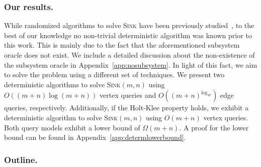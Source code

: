 \documentclass[runningheads,a4paper]{llncs}
\newcommand{\sink}{\textsc{Sink}\xspace}
\newcommand{\sinkmn}{\textsc{Sink}$(m,n)$\xspace}
\begin{document}


\vspace{-.2in}\subsubsection{Our results.}
While randomized algorithms to solve \sink have been previously studied~\cite{grid05,linepoint,grid08,falkthesis}, 
to the best of our knowledge no non-trivial deterministic algorithm was known prior to this work. This is mainly due to the fact that the aforementioned subsystem oracle does not exist. We include a detailed discussion about the non-existence of the subsystem oracle in Appendix~\ref{app:nosubsystem}.
In light of this fact, we aim to solve the problem using a different set of techniques.
We present two deterministic algorithms to solve \sinkmn using $O((m+n)\log (m+n))$ vertex queries
and $O((m+n)^{\log_47})$ edge queries, respectively. 
Additionally, if the Holt-Klee property holds, %
we exhibit a deterministic algorithm to solve \sinkmn using $O(m + n)$ vertex queries. 
Both query models exhibit a lower bound of $\Omega(m + n)$. A proof for the lower bound can be found in Appendix~\ref{app:determlowerbound}.

\vspace{-.2in}\subsubsection{Outline.}
\end{document}
